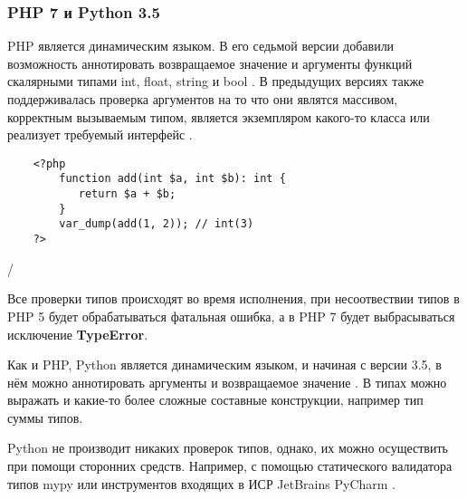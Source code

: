 \subsubsection{PHP 7 и Python 3.5}

PHP является динамическим языком. В его седьмой версии добавили возможность аннотировать возвращаемое значение и аргументы функций скалярными типами int, float, string и bool \cite{wiki:phpScalarTypeHints}. В предыдущих версиях также поддерживалась проверка аргументов на то что они являтся массивом, корректным вызываемым типом, является экземпляром какого-то класса или реализует требуемый интерфейс \cite{wiki:phpTypeHints}.

\begin{verbatim}
    <?php        
        function add(int $a, int $b): int {
           return $a + $b;
        }
        var_dump(add(1, 2)); // int(3)
    ?>
\end{verbatim}
 
        /%

Все проверки типов происходят во время исполнения, при несоотвествии типов в PHP 5 будет обрабатываться фатальная ошибка, а в PHP 7 будет выбрасываться исключение \textbf{TypeError}.

Как и PHP, Python является динамическим языком, и начиная с версии 3.5, в нём можно аннотировать аргументы и возвращаемое значение \cite{wiki:pythonPep484TypeHints}. В типах можно выражать и какие-то более сложные составные конструкции, например тип суммы типов. %
%    

Python не производит никаких проверок типов, однако, их можно осуществить при помощи сторонних средств. Например, с помощью статического валидатора типов mypy \cite{python:mypyHomepage} или инструментов входящих в ИСР JetBrains PyCharm \cite{python:PyCharmHomepage}.

